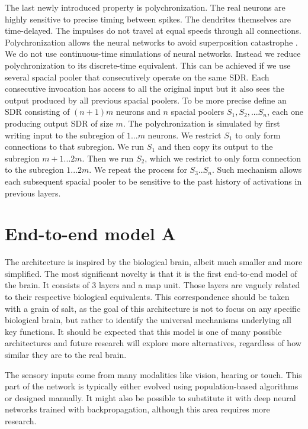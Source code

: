 \documentclass[12pt]{article}
\begin{document}
The last newly introduced property is polychronization. The real neurons are highly sensitive to precise timing between spikes. The dendrites themselves are time-delayed.
The impulses do not travel at equal speeds through all connections. Polychronization allows
the neural networks to avoid superposition catastrophe \cite{Polychronization}. We do not use continuous-time simulations of neural networks. Instead we reduce polychronization to its discrete-time equivalent. This can be achieved if we use several spacial pooler that consecutively operate on the same SDR. Each consecutive invocation has access to all the original input but it also sees the output produced by all previous spacial poolers. To be more precise define an SDR consisting of $(n+1)m$ neurons and $n$ spacial poolers $S_1,S_2,...S_n$, each one producing output SDR of size $m$. The polychronization is simulated by first writing input to the subregion of
$1...m$ neurons. We restrict $S_1$ to only form connections to that subregion. We run $S_1$ and then copy its output to the subregion $m+1...2m$. Then we run $S_2$, which we restrict to only form connection to the subregion $1...2m$. We repeat the process for $S_3..S_n$. Such mechanism allows each subsequent spacial pooler to be sensitive to the past history of activations in previous layers.  


\section{End-to-end model A} 
The architecture is inspired by the biological brain, albeit much smaller and more simplified. The most significant novelty is that it is the first end-to-end model of the brain.  It consists of 3 layers and a map unit. Those layers are vaguely related to their respective biological equivalents.
This correspondence should be taken with a grain of salt, as the goal of this architecture is not to focus on any specific biological brain, but rather to identify the universal mechanisms underlying all key functions. It should be expected that this model is one of many possible architectures and future research will explore more alternatives, regardless of how similar they are to the real brain.
 

The sensory inputs come from many modalities like vision, hearing or touch. This part of the network is typically either evolved using population-based algorithms or designed manually. It might also be possible to substitute it with deep neural networks trained with backpropagation, although this area requires more research. 
\end{document}
